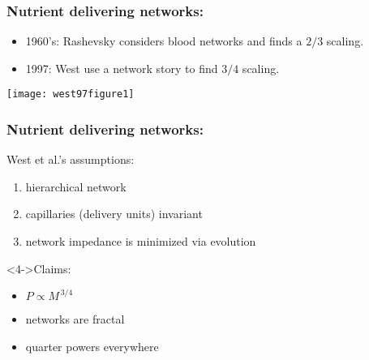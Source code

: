 \begin{frame}
  \frametitle{Nutrient delivering networks:}

  \begin{block}{}
    \begin{itemize}
    \item<1-> 
      1960's: Rashevsky considers
      blood networks and finds a $2/3$ scaling.
    \item<2-> 
      1997: West \etal\cite{west1997a} use a network story to find $3/4$ scaling.
    \end{itemize}
    \begin{overprint}
      \begin{center}
        \texttt{[image: west97figure1]}
      \end{center}
    \end{overprint}
    
  \end{block}

\end{frame}




\begin{frame}
  \frametitle{Nutrient delivering networks:}

      \begin{block}{West et al.'s assumptions:}
        \begin{enumerate}
        \item<1-> 
          hierarchical network
        \item<2-> 
          capillaries (delivery units) invariant
        \item<3-> 
          network impedance is minimized via evolution
        \end{enumerate}
      \end{block}

      \begin{block}<4->{Claims:}
        \begin{itemize}
        \item<4->
          $P \propto M^{\, 3/4}$
        \item<5-> 
          networks are fractal
        \item<6-> 
          quarter powers everywhere
        \end{itemize}
      \end{block}

\end{frame}

